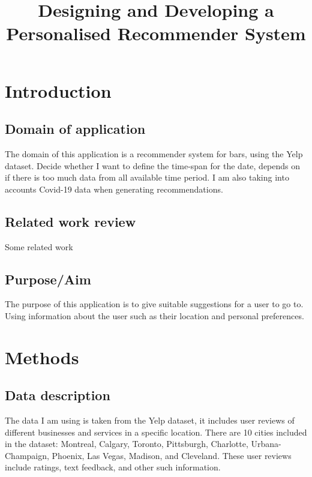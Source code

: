 \documentclass[conference]{IEEEtran}
\begin{document}
\title{Designing and Developing a Personalised Recommender System}

\author{
}

\maketitle


\section{Introduction}

\subsection{Domain of application}
The domain of this application is a recommender system for bars, using the Yelp dataset.
Decide whether I want to define the time-span for the date, 
depends on if there is too much data from all available time period.
I am also taking into accounts Covid-19 data when generating recommendations.

\subsection{Related work review}
Some related work

\subsection{Purpose/Aim}
The purpose of this application is to give suitable suggestions for a user to go to.
Using information about the user such as their location and personal preferences.


\section{Methods}

\subsection{Data description}
The data I am using is taken from the Yelp dataset,
it includes user reviews of different businesses and services in a specific location.
There are 10 cities included in the dataset: Montreal, Calgary, Toronto, Pittsburgh, Charlotte, 
Urbana-Champaign, Phoenix, Las Vegas, Madison, and Cleveland. 
These user reviews include ratings, text feedback, and other such information.
\end{document}
